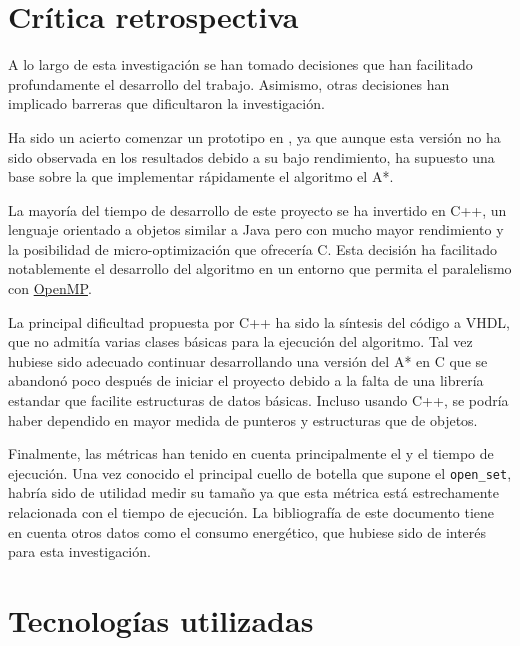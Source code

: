 \pagebreak
\section{Crítica retrospectiva}

A lo largo de esta investigación se han tomado decisiones que han facilitado profundamente
el desarrollo del trabajo.
Asimismo, otras decisiones han implicado barreras que dificultaron la investigación.

Ha sido un acierto comenzar un prototipo en \Python{},
ya que aunque esta versión no ha sido observada en los resultados
debido a su bajo rendimiento,
ha supuesto una base sobre la que implementar rápidamente
el algoritmo el A*.

La mayoría del tiempo de desarrollo de este proyecto se ha invertido
en C++, un lenguaje orientado a objetos similar a Java pero con mucho mayor rendimiento
y la posibilidad de micro-optimización que ofrecería C.
Esta decisión ha facilitado notablemente el desarrollo del algoritmo
en un entorno que permita el paralelismo con 
\href{https://www.openmp.org/}{OpenMP}\@.

La principal dificultad propuesta por C++ ha sido la síntesis del código
a VHDL, que no admitía varias clases básicas para la ejecución del algoritmo.
Tal vez hubiese sido adecuado continuar desarrollando una versión del A*
en C que se abandonó poco después de iniciar el proyecto
debido a la falta de una librería estandar que facilite
estructuras de datos básicas.
Incluso usando C++, se podría haber dependido
en mayor medida de punteros y estructuras que de objetos.

Finalmente, las métricas han tenido en cuenta principalmente el 
y el tiempo de ejecución.
Una vez conocido el principal cuello de botella que supone el \lstinline{open_set},
habría sido de utilidad medir su tamaño ya que esta métrica está
estrechamente relacionada con el tiempo de ejecución.
La bibliografía de este documento tiene en cuenta otros datos como el consumo energético,
que hubiese sido de interés para esta investigación.

\pagebreak
\section{Tecnologías utilizadas}

